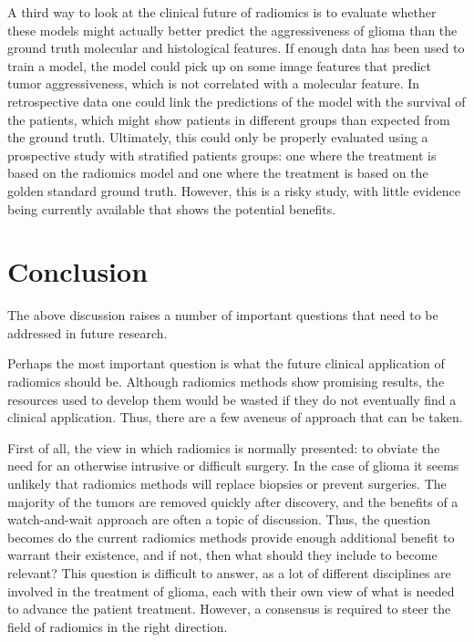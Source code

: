 A third way to look at the clinical future of radiomics is to evaluate whether these models might actually better predict the aggressiveness of \gls{glioma} than the ground truth molecular and histological features.
If enough data has been used to train a model, the model could pick up on some image features that predict \gls{tumor} aggressiveness, which is not correlated with a molecular feature.
In retrospective data one could link the predictions of the model with the survival of the patients, which might show patients in different groups than expected from the ground truth.
Ultimately, this could only be properly evaluated using a prospective study with stratified patients groups: one where the treatment is based on the radiomics model and one where the treatment is based on the golden standard ground truth.
However, this is a risky study, with little evidence being currently available that shows the potential benefits.

\section{Conclusion}\label{sec:discussion_conclusion}


The above discussion raises a number of important questions that need to be addressed in future research.

Perhaps the most important question is what the future clinical application of radiomics should be.
Although radiomics methods show promising results, the resources used to develop them would be wasted if they do not eventually find a clinical application.
Thus, there are a few aveneus of approach that can be taken.

First of all, the view in which radiomics is normally presented: to obviate the need for an otherwise intrusive or difficult surgery.
In the case of glioma it seems unlikely that radiomics methods will replace biopsies or prevent surgeries.
The majority of the \glspl{tumor} are removed quickly after discovery, and the benefits of a watch-and-wait approach are often a topic of discussion.
Thus, the question becomes do the current radiomics methods provide enough additional benefit to warrant their existence, and if not, then what should they include to become relevant?
This question is difficult to answer, as a lot of different disciplines are involved in the treatment of glioma, each with their own view of what is needed to advance the patient treatment.
However, a consensus is required to steer the field of radiomics in the right direction.

